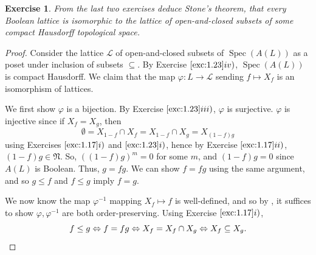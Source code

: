 \documentclass[12pt,letterpaper]{article}
\newtheorem{problem}{Exercise}[section]
\theoremstyle{definition}
\theoremstyle{remark}
\numberwithin{figure}{problem}
\numberwithin{equation}{section}
\DeclareMathOperator{\Spec}{Spec}
\newcommand{\LL}{\mathscr{L}}
\begin{document}
\begin{problem}
  From the last two exercises deduce Stone's theorem, that every Boolean lattice is isomorphic to the lattice of open-and-closed subsets of some compact Hausdorff topological space.
\end{problem}
\begin{proof}
  Consider the lattice $\LL$ of open-and-closed subsets of $\Spec (A(L))$ as a poset under inclusion of subsets $\subseteq$. By Exercise $\ref{exc:1.23}iv)$, $\Spec(A(L))$ is compact Hausdorff. We claim that the map $\varphi\colon L \to \LL$ sending $f \mapsto X_f$ is an isomorphism of lattices.
  \par We first show $\varphi$ is a bijection. By Exercise $\ref{exc:1.23}iii)$, $\varphi$ is surjective. $\varphi$ is injective since if $X_f = X_g$, then
  \begin{equation*}
    \emptyset = X_{1-f} \cap X_f = X_{1-f} \cap X_g = X_{(1-f)g}
  \end{equation*}
  using Exercises $\ref{exc:1.17}i)$ and $\ref{exc:1.23}i)$, hence by Exercise $\ref{exc:1.17}ii)$, $(1-f)g \in \mathfrak{N}$. So, $\left((1-f)g\right)^m = 0$ for some $m$, and $(1-f)g = 0$ since $A(L)$ is Boolean. Thus, $g = fg$. We can show $f = fg$ using the same argument, and so $g \le f$ and $f \le g$ imply $f = g$.
  \par We now know the map $\varphi^{-1}$ mapping $X_f \mapsto f$ is well-defined, and so by \cite[Thm.~2.3]{BS81}, it suffices to show $\varphi,\varphi^{-1}$ are both order-preserving. Using Exercise $\ref{exc:1.17}i)$,
  \begin{equation*}
    f \le g \Leftrightarrow f = fg \Leftrightarrow X_f = X_f \cap X_g \Leftrightarrow X_f \subseteq X_g.\qedhere
  \end{equation*}
\end{proof}
\end{document}
